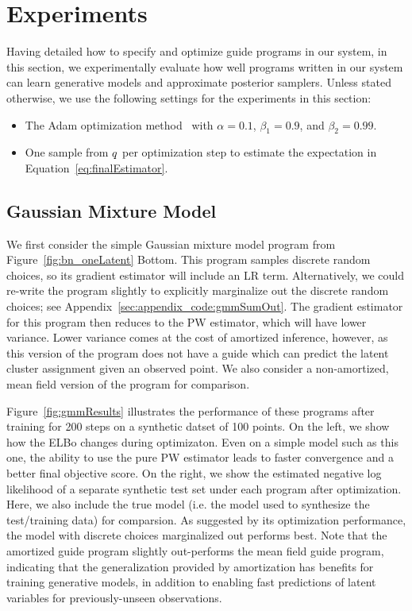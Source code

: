 \section{Experiments}
\label{sec:results}

Having detailed how to specify and optimize guide programs in our system, in this section, we experimentally evaluate how well programs written in our system can learn generative models and approximate posterior samplers. Unless stated otherwise, we use the following settings for the experiments in this section:
\begin{itemize}
\item{The Adam optimization method~\cite{Adam} with $\alpha = 0.1$, $\beta_1 = 0.9$, and $\beta_2 = 0.99$.}
\item{One sample from $q$ per optimization step to estimate the expectation in Equation~\ref{eq:finalEstimator}.}
\end{itemize}

\subsection{Gaussian Mixture Model}
\label{sec:results_gmm}

We first consider the simple Gaussian mixture model program from Figure~\ref{fig:bn_oneLatent} Bottom. This program samples discrete random choices, so its gradient estimator will include an LR term. Alternatively, we could re-write the program slightly to explicitly marginalize out the discrete random choices; see Appendix~\ref{sec:appendix_code:gmmSumOut}. The gradient estimator for this program then reduces to the PW estimator, which will have lower variance. Lower variance comes at the cost of amortized inference, however, as this version of the program does not have a guide which can predict the latent cluster assignment given an observed point. We also consider a non-amortized, mean field version of the program for comparison.

Figure~\ref{fig:gmmResults} illustrates the performance of these programs after training for 200 steps on a synthetic datset of 100 points. On the left, we show how the ELBo changes during optimizaton. Even on a simple model such as this one, the ability to use the pure PW estimator leads to faster convergence and a better final objective score.
On the right, we show the estimated negative log likelihood of a separate synthetic test set under each program after optimization. Here, we also include the true model (i.e. the model used to synthesize the test/training data) for comparsion.
As suggested by its optimization performance, the model with discrete choices marginalized out performs best.
Note that the amortized guide program slightly out-performs the mean field guide program, indicating that the generalization provided by amortization has benefits for training generative models, in addition to enabling fast predictions of latent variables for previously-unseen observations.

